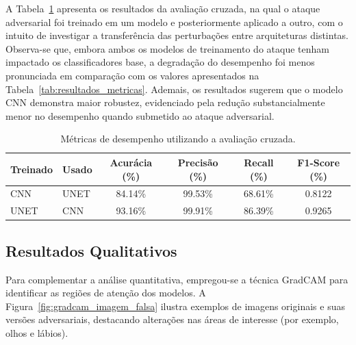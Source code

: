\documentclass[12pt]{article}
\begin{document}
A Tabela~\ref{tab:resultados_cruzada} apresenta os resultados da avaliação
cruzada, na qual o ataque adversarial foi treinado em um modelo e
posteriormente aplicado a outro, com o intuito de investigar a transferência
das perturbações entre arquiteturas distintas. Observa-se que, embora ambos os
modelos de treinamento do ataque tenham impactado os classificadores base, a
degradação do desempenho foi menos pronunciada em comparação com os valores
apresentados na Tabela~\ref{tab:resultados_metricas}. Ademais, os resultados
sugerem que o modelo CNN demonstra maior robustez, evidenciado pela redução
substancialmente menor no desempenho quando submetido ao ataque adversarial.

\begin{table}[htbp]
    \centering
    \caption{Métricas de desempenho utilizando a avaliação cruzada.}\label{tab:resultados_cruzada}
    \begin{tabular}{llcccc}
        \hline
        \textbf{Treinado} & \textbf{Usado} & \textbf{Acurácia (\%)} & \textbf{Precisão (\%)} & \textbf{Recall (\%)} & \textbf{F1-Score (\%)} \\

        \hline
        CNN               & UNET           & 84.14\%                & 99.53\%                & 68.61\%              & 0.8122                 \\
        UNET              & CNN            & 93.16\%                & 99.91\%                & 86.39\%              & 0.9265                 \\
        \hline
    \end{tabular}
\end{table}

\subsection{Resultados Qualitativos}
Para complementar a análise quantitativa, empregou-se a técnica GradCAM para
identificar as regiões de atenção dos modelos. A
Figura~\ref{fig:gradcam_imagem_falsa} ilustra exemplos de imagens originais e
suas versões adversariais, destacando alterações nas áreas de interesse (por
exemplo, olhos e lábios).
\end{document}
